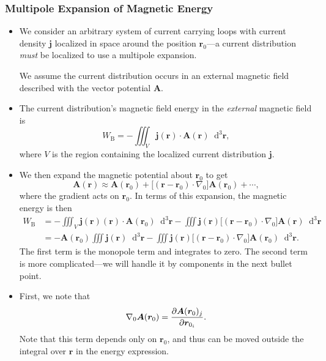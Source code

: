 \documentclass[11pt, a4paper]{article}
\newcommand{\diff}{\mathop{}\!\mathrm{d}} %
\newcommand{\dr}{\diff^{3} \r}  %
\renewcommand{\vec}[1]{\bm{#1}} %
\renewcommand{\r}{\vec{r}}
\newcommand{\A}{\vec{A}} %
\renewcommand{\j}{\vec{j}}  %
\renewcommand{\grad}{\nabla}
\begin{document}
\subsubsection{Multipole Expansion of Magnetic Energy}
\begin{itemize}
	\item We consider an arbitrary system of current carrying loops with current density $ \j $ localized in space around the position $ \r_{0} $---a current distribution \textit{must} be localized to use a multipole expansion. 
	
	We assume the current distribution occurs in an external magnetic field described with the vector potential $ \A $. 
	
	\item The current distribution's magnetic field energy in the \textit{external} magnetic field is
	\begin{equation*}
		W_{\text{B}} = - \iiint_{V} \j(\r) \cdot \A(\r) \dr,
	\end{equation*}
	where $ V $ is the region containing the localized current distribution $ \j $. 
	
	\item We then expand the magnetic potential about $ \r_{0} $ to get
	\begin{equation*}
		\A(\r) \approx \A(\r_{0}) + \big[(\r - \r_{0}) \cdot \grad_{0}\big] \A(\r_{0}) + \cdots,
	\end{equation*}
	where the gradient acts on $ \r_{0} $. In terms of this expansion, the magnetic energy is then
	\begin{align*}
		W_{\text{B}} &= - \iiint_{V}\j(\r) (\r)\cdot \A(\r_{0}) \dr - \iiint \j(\r) \big[(\r - \r_{0}) \cdot \grad_{0}\big] \A(\r) \dr\\
		& = - \A(\r_{0})\iiint \j(\r)\dr - \iiint \j(\r)\big[(\r - \r_{0})\cdot \grad_{0}\big] \A(\r_{0})\dr.
	\end{align*}
	The first term is the monopole term and integrates to zero. The second term is more complicated---we will handle it by components in the next bullet point.

    \item First, we note that
	\begin{equation*}
		\grad_{0} \A(\r_{0}) = \pdv{\A(\r_{0})_{j}}{\r_{0_{i}}}.
	\end{equation*}
	Note that this term depends only on $ \r_{0} $, and thus can be moved outside the integral over $ \r $ in the energy expression.
	

\end{itemize}
\end{document}

